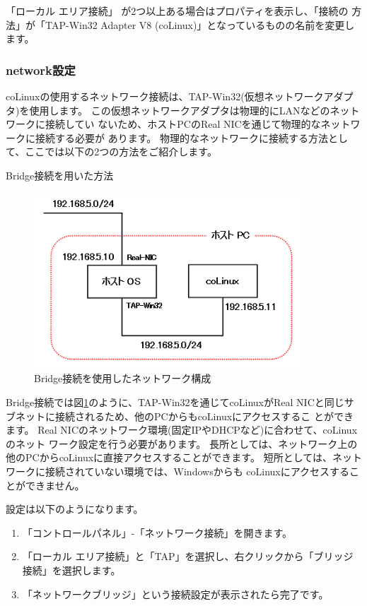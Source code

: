 \documentclass[mingoth,a4paper]{jsarticle}
\begin{document}
「ローカル エリア接続」 が2つ以上ある場合はプロパティを表示し、「接続の
方法」が「TAP-Win32 Adapter V8 (coLinux)」となっているものの名前を変更し
ます。

\subsubsection{network設定}
coLinuxの使用するネットワーク接続は、TAP-Win32(仮想ネットワークアダプタ)を使用します。
この仮想ネットワークアダプタは物理的にLANなどのネットワークに接続してい
ないため、ホストPCのReal NICを通じて物理的なネットワークに接続する必要が
あります。
物理的なネットワークに接続する方法として、ここでは以下の2つの方法をご紹介します。

Bridge接続を用いた方法

\begin{figure}[htbp]
 \begin{center}
  \includegraphics[width=100mm]{image200804/colinux_bridge.png}
 \end{center}
 \caption{Bridge接続を使用したネットワーク構成}
 \label{fig:bridge}
\end{figure}

Bridge接続では図\ref{fig:bridge}のように、TAP-Win32を通じてcoLinuxがReal
NICと同じサブネットに接続されるため、他のPCからもcoLinuxにアクセスするこ
とができます。
Real NICのネットワーク環境(固定IPやDHCPなど)に合わせて、coLinuxのネット
ワーク設定を行う必要があります。
長所としては、ネットワーク上の他のPCからcoLinuxに直接アクセスすることができます。
短所としては、ネットワークに接続されていない環境では、Windowsからも
coLinuxにアクセスすることができません。

設定は以下のようになります。
\begin{enumerate}
\item 「コントロールパネル」-「ネットワーク接続」を開きます。
\item 「ローカル エリア接続」と「TAP」を選択し、右クリックから「ブリッジ接続」を選択します。
\item 「ネットワークブリッジ」という接続設定が表示されたら完了です。
\end{enumerate}
\end{document}
